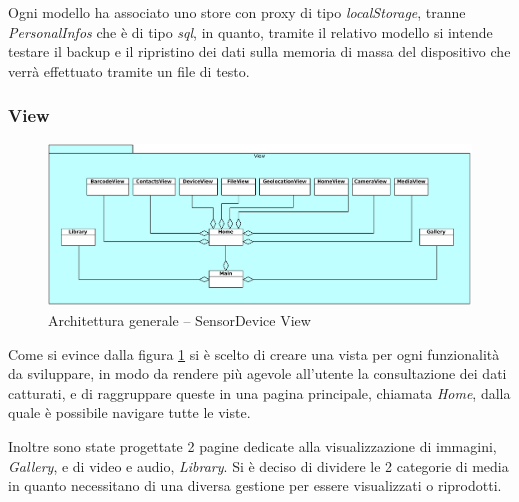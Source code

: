 Ogni modello ha associato uno store con proxy di tipo \emph{localStorage}, tranne \emph{PersonalInfos} che è di tipo \emph{sql}, in quanto, tramite il relativo modello si intende testare il backup e il ripristino dei dati sulla memoria di massa del dispositivo che verrà effettuato tramite un file di testo.

\subsubsection{View}
\begin{figure}[htb]
\centering
\includegraphics[scale=0.45]{gfx/class/SensorDevice_View.pdf}
\caption{Architettura generale -- SensorDevice View}
\label{fig:architettura SensorDevice View}
\end{figure}
Come si evince dalla figura \ref{fig:architettura SensorDevice View} si è scelto di creare una vista per ogni funzionalità da sviluppare, in modo da rendere più agevole all'utente la consultazione dei dati catturati, e di raggruppare queste in una pagina principale, chiamata \emph{Home}, dalla quale è possibile navigare tutte le viste.

Inoltre sono state progettate 2 pagine dedicate alla visualizzazione di immagini, \emph{Gallery}, e di video e audio, \emph{Library}.
Si è deciso di dividere le 2 categorie di media in quanto necessitano di una diversa gestione per essere visualizzati o riprodotti.

